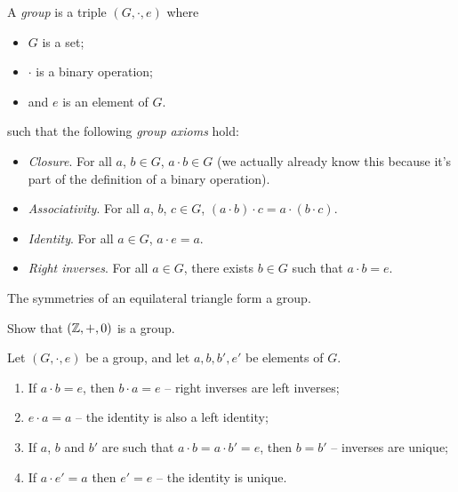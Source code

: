 \documentclass{../template/note}
\begin{document}
    \begin{definition}
        A \emph{group} is a triple \((G, \cdot, e)\) where
        \begin{itemize}
            \item \(G\) is a set;
            \item \(\cdot\) is a binary operation;
            \item and \(e\) is an element of \(G\).
        \end{itemize}
        such that the following \emph{group axioms} hold:
        \begin{itemize}
            \item \emph{Closure}. For all \(a\), \(b \in G\), \(a \cdot b \in G\) (we actually already know this because it's part of the definition of a binary operation).
            \item \emph{Associativity}. For all \(a\), \(b\), \(c \in G\), \((a \cdot b) \cdot c = a \cdot (b \cdot c)\).
            \item \emph{Identity}. For all \(a \in G\), \(a \cdot e = a\).
            \item \emph{Right inverses}. For all \(a \in G\), there exists \(b \in G\) such that \(a \cdot b = e\). 
        \end{itemize}        
    \end{definition}
    
    \begin{example*}
        The symmetries of an equilateral triangle form a group.
    \end{example*}
    
    \begin{exercise}
        Show that \((\mathbb Z, +, 0)\) is a group.
    \end{exercise}


    \begin{proposition}
        Let \((G, \cdot, e)\) be a group, and let \(a, b, b', e'\) be elements of \(G\).
        \begin{enumerate}
            \item If \(a \cdot b = e\), then \(b \cdot a = e\) -- right inverses are left inverses;
            \item \(e \cdot a = a\) -- the identity is also a left identity;
            \item If \(a\), \(b\) and \(b'\) are such that \(a \cdot b = a \cdot b' = e\), then \(b = b'\) -- inverses are unique;
            \item If \(a \cdot e' = a\) then \(e' = e\) -- the identity is unique.
        \end{enumerate}
        
        
    \end{proposition}
\end{document}
